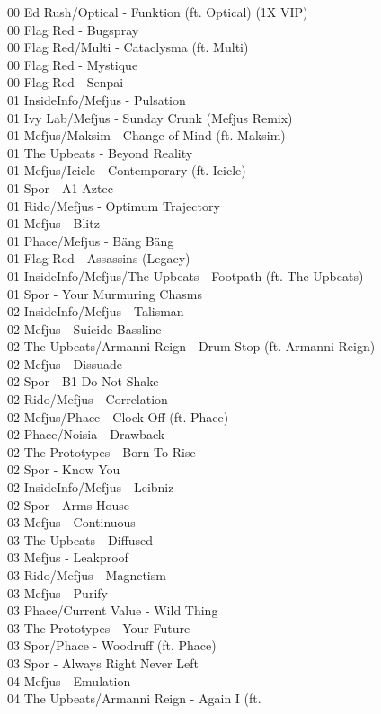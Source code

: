 \begin{multicols}{2}
 00 Ed Rush/Optical - Funktion (ft. Optical) (1X VIP)\\ 00 Flag Red - Bugspray\\ 00 Flag Red/Multi - Cataclysma (ft. Multi)\\ 00 Flag Red - Mystique\\ 00 Flag Red - Senpai\\ 01 InsideInfo/Mefjus - Pulsation\\ 01 Ivy Lab/Mefjus - Sunday Crunk (Mefjus Remix)\\ 01 Mefjus/Maksim - Change of Mind (ft. Maksim)\\ 01 The Upbeats - Beyond Reality\\ 01 Mefjus/Icicle - Contemporary (ft. Icicle)\\ 01 Spor - A1 Aztec\\ 01 Rido/Mefjus - Optimum Trajectory\\ 01 Mefjus - Blitz\\ 01 Phace/Mefjus - B\"ang B\"ang\\ 01 Flag Red - Assassins (Legacy)\\ 01 InsideInfo/Mefjus/The Upbeats - Footpath (ft. The Upbeats)\\ 01 Spor - Your Murmuring Chasms\\ 02 InsideInfo/Mefjus - Talisman\\ 02 Mefjus - Suicide Bassline\\ 02 The Upbeats/Armanni Reign - Drum Stop (ft. Armanni Reign)\\ 02 Mefjus - Dissuade\\ 02 Spor - B1 Do Not Shake\\ 02 Rido/Mefjus - Correlation\\ 02 Mefjus/Phace - Clock Off (ft. Phace)\\ 02 Phace/Noisia - Drawback\\ 02 The Prototypes - Born To Rise\\ 02 Spor - Know You\\ 02 InsideInfo/Mefjus - Leibniz\\ 02 Spor - Arms House\\ 03 Mefjus - Continuous\\ 03 The Upbeats - Diffused\\ 03 Mefjus - Leakproof\\ 03 Rido/Mefjus - Magnetism\\ 03 Mefjus - Purify\\ 03 Phace/Current Value - Wild Thing\\ 03 The Prototypes - Your Future\\ 03 Spor/Phace - Woodruff (ft. Phace)\\ 03 Spor - Always Right Never Left\\ 04 Mefjus - Emulation\\ 04 The Upbeats/Armanni Reign - Again I (ft. 
\end{multicols}
